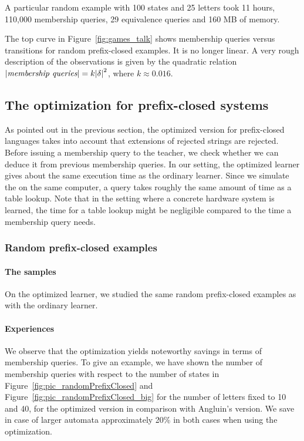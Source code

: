 A particular random example with 100 states and 25 letters took 11
hours, 110,000 membership queries, 29 equivalence queries and 160 MB
of memory.

The top curve in Figure~\ref{fig:games_talk} shows
membership queries versus transitions for random prefix-closed
examples. It is no longer linear. A very rough description
of the observations is given by the quadratic relation $|\textit{membership queries}| = k
{|\delta|}^2$, where $k \approx 0.016$.

\subsection{The optimization for prefix-closed systems}

As pointed out in the previous section, the optimized version for
prefix-closed languages takes into account that extensions of rejected
strings are rejected. Before issuing a membership query to the
teacher, we check whether we can deduce it from previous membership
queries. In our setting, the optimized learner gives about the same
execution time as the ordinary learner. Since we simulate the \Teacher
on the same computer, a query takes roughly the same amount of time as
a table lookup. Note that in the setting where a concrete hardware
system is learned, the time for a table lookup might be negligible
compared to the time a membership query needs.

\subsubsection{Random prefix-closed examples}

\paragraph{The samples}
On the optimized learner, we studied the same random prefix-closed examples as with the ordinary learner.

\paragraph{Experiences}

We observe that the optimization yields noteworthy savings in terms
of membership queries. To give an example, we have shown the number of
membership queries with respect to the number of states in
Figure~\ref{fig:pic_randomPrefixClosed} and Figure~\ref{fig:pic_randomPrefixClosed_big} for the number of letters
fixed to 10 and 40, for the optimized version in comparison with
Angluin's version. We save in case of larger automata approximately
20\% in both cases when using the optimization.


